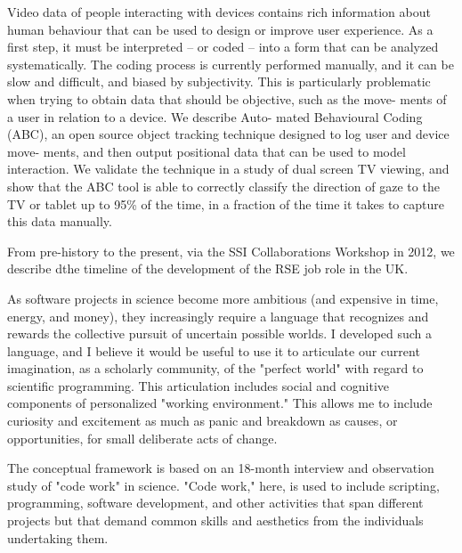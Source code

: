 \documentclass[a4paper,UKenglish]{dagrep}
\begin{document}
Video data of people interacting with devices contains rich information about human behaviour that can be used to design or improve user experience. As a first step, it must be interpreted – or coded – into a form that can be analyzed systematically. The coding process is currently performed manually, and it can be slow and difficult, and biased by subjectivity. This is particularly problematic when trying to obtain data that should be objective, such as the move- ments of a user in relation to a device. We describe Auto- mated Behavioural Coding (ABC), an open source object tracking technique designed to log user and device move- ments, and then output positional data that can be used to model interaction. We validate the technique in a study of dual screen TV viewing, and show that the ABC tool is able to correctly classify the direction of gaze to the TV or tablet up to 95\% of the time, in a fraction of the time it takes to capture this data manually.
 

From pre-history to the present, via the SSI Collaborations Workshop in 2012, we describe dthe timeline of the development of the RSE job role in the UK.


As software projects in science become more ambitious (and expensive in time, energy, and money), they increasingly require a language that recognizes and rewards the collective pursuit of uncertain possible worlds. I developed such a language, and I believe it would be useful to use it to articulate our current imagination, as a scholarly community, of the "perfect world" with regard to scientific programming. This articulation includes social and cognitive components of personalized "working environment." This allows me to include curiosity and excitement as much as panic and breakdown as causes, or opportunities, for small deliberate acts of change.

The conceptual framework is based on an 18-month interview and observation study of "code work" in science. "Code work," here, is used to include scripting, programming, software development, and other activities that span different projects but that demand common skills and aesthetics from the individuals undertaking them.
\end{document}
